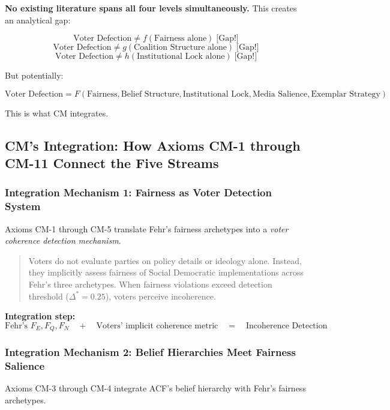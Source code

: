 \textbf{No existing literature spans all four levels simultaneously.} This creates an analytical gap:

$$\text{Voter Defection} \neq f(\text{Fairness alone}) \; \text{[Gap!]}$$
$$\text{Voter Defection} \neq g(\text{Coalition Structure alone}) \; \text{[Gap!]}$$
$$\text{Voter Defection} \neq h(\text{Institutional Lock alone}) \; \text{[Gap!]}$$

But potentially:

$$\text{Voter Defection} = F(\text{Fairness}, \text{Belief Structure}, \text{Institutional Lock}, \text{Media Salience}, \text{Exemplar Strategy})$$

This is what CM integrates.

\subsection{CM's Integration: How Axioms CM-1 through CM-11 Connect the Five Streams}

\subsubsection{Integration Mechanism 1: Fairness as Voter Detection System}

Axioms CM-1 through CM-5 translate Fehr's fairness archetypes into a \textit{voter coherence detection mechanism}.

\begin{quote}
Voters do not evaluate parties on policy details or ideology alone. Instead, they implicitly assess
fairness of Social Democratic implementations across Fehr's three archetypes. When fairness violations
exceed detection threshold ($\Delta^* = 0.25$), voters perceive incoherence.
\end{quote}

\textbf{Integration step:}
\begin{equation}
\text{Fehr's } F_E, F_Q, F_N \quad + \quad \text{Voters' implicit coherence metric} \quad = \quad \text{Incoherence Detection}
\end{equation}

\subsubsection{Integration Mechanism 2: Belief Hierarchies Meet Fairness Salience}

Axioms CM-3 through CM-4 integrate ACF's belief hierarchy with Fehr's fairness archetypes.

